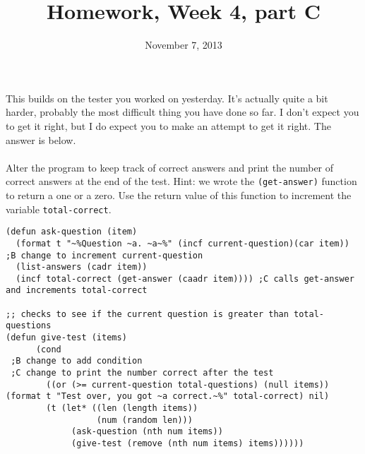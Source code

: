 \documentclass{article}
\title{Homework, Week 4, part C}
\date{November 7, 2013}
\begin{document}
\maketitle{}

\paragraph{}This builds on the tester you worked on yesterday. It's actually quite a bit harder, probably the most difficult thing you have done so far. I don't expect you to get it right, but I do expect you to make an attempt to get it right. The answer is below.

\paragraph{}Alter the program to keep track of correct answers and print the number of correct answers at the end of the test. Hint: we wrote the \texttt{(get-answer)} function to return a one or a zero. Use the return value of this function to increment the variable \texttt{total-correct}.

\lstset{language=Lisp,numbers=left,keepspaces=false,basicstyle=\small,numberstyle=\tiny,breaklines=true,showstringspaces=false}
\begin{lstlisting}
(defun ask-question (item)
  (format t "~%Question ~a. ~a~%" (incf current-question)(car item)) ;B change to increment current-question
  (list-answers (cadr item))
  (incf total-correct (get-answer (caadr item)))) ;C calls get-answer and increments total-correct

;; checks to see if the current question is greater than total-questions
(defun give-test (items)
      (cond
 ;B change to add condition
 ;C change to print the number correct after the test
        ((or (>= current-question total-questions) (null items)) (format t "Test over, you got ~a correct.~%" total-correct) nil)
        (t (let* ((len (length items))
                  (num (random len)))
             (ask-question (nth num items))
             (give-test (remove (nth num items) items))))))
\end{lstlisting}
\end{document}
